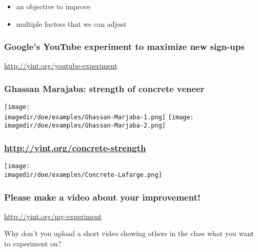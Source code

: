


\begin{frame}\frametitle{}
	\begin{itemize}
		\item	\LARGE an {\color{purple}objective} to improve
		\item	\LARGE multiple {\color{purple}factors} that we can adjust
	\end{itemize}
\end{frame}

\begin{frame}\frametitle{Google's YouTube experiment to maximize new sign-ups}
	\begin{center}
		\Huge{\href{http://yint.org/youtube-experiment}{http://yint.org/youtube-experiment}}
	\end{center}	
\end{frame}

\begin{frame}\frametitle{Ghassan Marajaba: strength of concrete veneer}
	\begin{center}
		\texttt{[image: \\imagedir/doe/examples/Ghassan-Marjaba-1.png]}
		\texttt{[image: \\imagedir/doe/examples/Ghassan-Marjaba-2.png]}
	\end{center}
\end{frame}

\begin{frame}\frametitle{\href{http://yint.org/concrete-strength}{http://yint.org/concrete-strength}}
	\begin{center}
		\texttt{[image: \\imagedir/doe/examples/Concrete-Lafarge.png]}
	\end{center}
\end{frame}

\begin{frame}\frametitle{Please make a video about your improvement!}
	{\Huge \href{http://yint.org/my-experiment}{http://yint.org/my-experiment}
	
	\vspace{24pt}	
	Why don't you upload a short video showing others in the class what you want to experiment on?	
	}
\end{frame}



